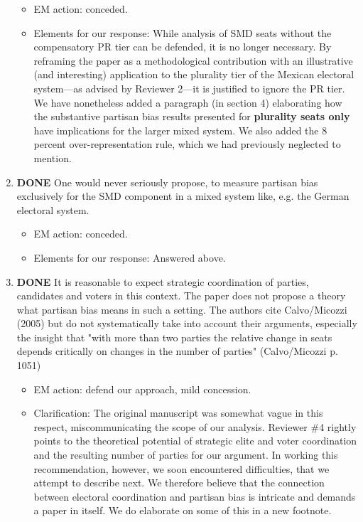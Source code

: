 \documentclass{article}
\begin{document}
\begin{enumerate}
\label{sec:orgheadline22}
\begin{itemize}
\item EM action: conceded.
\item Elements for our response: While analysis of SMD seats without the compensatory PR tier can be defended, it is no longer necessary. By reframing the paper as a methodological contribution with an illustrative (and interesting) application to the plurality tier of the Mexican electoral system---as advised by Reviewer 2---it is justified to ignore the PR tier. We have nonetheless added a paragraph (in section 4) elaborating how the substantive partisan bias results presented for \textbf{plurality seats only} have implications for the larger mixed system. We also added the 8 percent over-representation rule, which we had previously neglected to mention.
\end{itemize}
\item {\bfseries\sffamily DONE} One would never seriously propose, to measure partisan bias exclusively for the SMD component in a mixed system like, e.g. the German electoral system.
\label{sec:orgheadline23}
\begin{itemize}
\item EM action: conceded.
\item Elements for our response: Answered above.
\end{itemize}
\item {\bfseries\sffamily DONE} It is reasonable to expect strategic coordination of parties, candidates and voters in this context. The paper does not propose a theory what partisan bias means in such a setting. The authors cite Calvo/Micozzi (2005) but do not systematically take into account their arguments, especially the insight that "with more than two parties the relative change in seats depends critically on changes in the number of parties" (Calvo/Micozzi p. 1051)
\label{sec:orgheadline24}
\begin{itemize}
\item EM action: defend our approach, mild concession.
\item Clarification: The original manuscript was somewhat vague in this respect, miscommunicating the scope of our analysis. Reviewer \#4 rightly points to the theoretical potential of strategic elite and voter coordination and the resulting number of parties for our argument. In working this recommendation, however, we soon encountered difficulties, that we attempt to describe next. We therefore believe that the connection between electoral coordination and partisan bias is intricate and demands a paper in itself. We do elaborate on some of this in a new footnote.

\end{itemize}
\end{enumerate}
\end{document}
